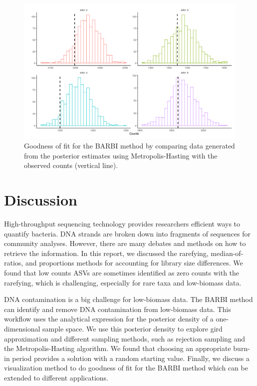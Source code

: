 \documentclass[12pt]{article}
\begin{document}
\begin{figure}[H]
	\centering
	\includegraphics[width=\textwidth]{goodness_mh.png}
	\caption{Goodness of fit for the BARBI method by comparing data generated from the posterior estimates using Metropolis-Hasting with the observed counts (vertical line).}
	\label{fig:good_mh}     
\end{figure}



\section{Discussion}

High-throughput sequencing technology provides researchers efficient ways to quantify bacteria. DNA strands are broken down into fragments of sequences for community analyses. However, there are many debates and methods on how to retrieve the information. In this report, we discussed the rarefying, median-of-ratios, and proportions methods for accounting for library size differences. We found that low counts ASVs are sometimes identified as zero counts with the rarefying, which is challenging, especially for rare taxa and low-biomass data. 

DNA contamination is a big challenge for low-biomass data. The BARBI method can identify and remove DNA contamination from low-biomass data. This workflow uses the analytical expression for the posterior density of a one-dimensional sample space. We use this posterior density to explore gird approximation and different sampling methods, such as rejection sampling and the Metropolis-Hasting algorithm. We found that choosing an appropriate burn-in period provides a solution with a random starting value. Finally, we discuss a visualization method to do goodness of fit for the BARBI method which can be extended to different applications. 
\end{document}
